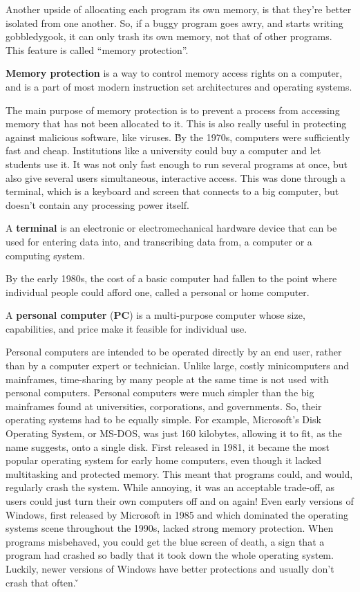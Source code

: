 Another upside of allocating each program its own memory, is that they're better isolated from one another. So, if a
buggy program goes awry, and starts writing gobbledygook, it can only trash its own memory, not that of other
programs. This feature is called ``memory protection''.

\textbf{Memory protection} is a way to control memory access rights on a computer, and is a part of most modern
instruction set architectures and operating systems.
\ed

The main purpose of memory protection is to prevent a process from accessing memory that has not been allocated to it.
This is also really useful in protecting against malicious software, like viruses. \v

By the 1970s, computers were sufficiently fast and cheap. Institutions like a university could buy a computer and let
students use it. It was not only fast enough to run several programs at once, but also give several users
simultaneous, interactive access. This was done through a terminal, which is a keyboard and screen that connects to a
big computer, but doesn't contain any processing power itself.

\bd[Terminal]
A \textbf{terminal} is an electronic or electromechanical hardware device that can be used for entering data into,
and transcribing data from, a computer or a computing system.
\ed

By the early 1980s, the cost of a basic computer had fallen to the point where individual people could afford one,
called a personal or home computer.

A \textbf{personal computer} (\textbf{PC}) is a multi-purpose computer whose size, capabilities, and price make it
feasible for individual use.
\ed

Personal computers are intended to be operated directly by an end user, rather than by a computer expert or
technician. Unlike large, costly minicomputers and mainframes, time-sharing by many people at the same time is not
used with personal computers. \v

Personal computers were much simpler than the big mainframes found at universities, corporations, and governments. So,
their operating systems had to be equally simple. For example, Microsoft's Disk Operating System, or MS-DOS, was
just 160 kilobytes, allowing it to fit, as the name suggests, onto a single disk. First released in 1981, it became
the most popular operating system for early home computers, even though it lacked multitasking and protected memory.
This meant that programs could, and would, regularly crash the system. While annoying, it was an acceptable trade-off,
as users could just turn their own computers off and on again! Even early versions of Windows, first released
by Microsoft in 1985 and which dominated the operating systems scene throughout the 1990s, lacked strong memory
protection. When programs misbehaved, you could get the blue screen of death, a sign that a program had crashed so
badly that it took down the whole operating system. Luckily, newer versions of Windows have better protections and
usually don't crash that often. \v

